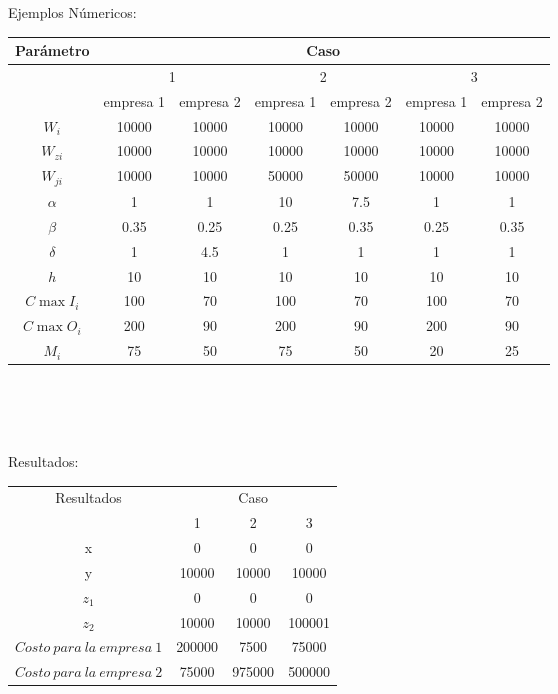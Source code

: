 \documentclass{article}
\begin{document}
 \vspace{1.0cm}
\begin{center}
{\Large Ejemplos N\'umericos:}
\end{center}



\begin{tabular}{|c|c|c|c|c|c|c|}
\hline
\multicolumn{1}{|c|}{Par\'ametro}& \multicolumn{6}{|c|}{Caso} \\
\hline
 & \multicolumn{2}{|c|}{1} & \multicolumn{2}{|c|}{2} & \multicolumn{2}{|c|}{3} \\ 
\hline
 & empresa 1 & empresa 2 & empresa 1 & empresa 2  & empresa 1 & empresa 2   \\  


\hline
$ W_{i}$ & 10000&  10000& 10000 &  10000&  10000 & 10000 \\
$ W_{zi}$  & 10000&  10000& 10000 &  10000&  10000 & 10000  \\
 $ W_{ji}$  & 10000 &10000 & 50000 & 50000& 10000 &10000 \\
 $ \alpha $   & 1& 1& 10 & 7.5 & 1  &  1 \\
$ \beta $  & 0.35 & 0.25& 0.25 & 0.35 & 0.25 & 0.35 \\
$ \delta $  & 1 & 4.5 & 1 &1 & 1 & 1 \\
$h$   & 10 & 10  &10 & 10  &10  & 10 \\
$ C\max{I_{i}} $  &100 & 70 &100 & 70 &100 & 70 \\
$ C\max{O_{i }}$  &200 & 90 &200 & 90&200 & 90\\
$ M_i $  & 75& 50 & 75  & 50 & 20  &  25\\

\hline
\end{tabular} \\ \\ \\


\begin{center}
{\Large Resultados:}
\end{center}







\begin{center}
\begin{tabular}{|c|c|c|c|}
\hline

\multicolumn{1}{|c|}{Resultados} & \multicolumn{3}{|c|}{Caso}\\

 & 1 & 2 & 3\\
\hline
  x & 0&  0 & 0 \\ 
\hline
  y &10000 & 10000 & 10000 \\
\hline
  $z_{1}$ & 0 & 0 & 0 \\
\hline
  $z_{2}$  &10000 & 10000 & 100001  \\
\hline
  $Costo~para~ la~ empresa~1$ & 200000 & 7500 & 75000\\
\hline
  $Costo~para~la~empresa~2$ & 75000 & 975000 & 500000\\
\hline
\end{tabular}

\end{center}
\end{document}
